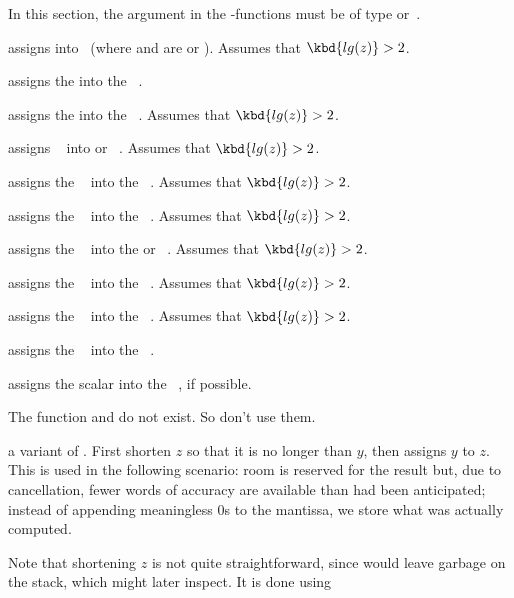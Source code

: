 In this section, the  argument in the -functions must be of type
 or~.

 assigns  into~ (where 
and  are  or ).
Assumes that $\kbd{lg(z)} > 2$.

 assigns the   into the
~.

 assigns the   into the
~. Assumes that $\kbd{lg(z)} > 2$.

 assigns ~ into  or
~. Assumes that $\kbd{lg(z)} > 2$.

 assigns the ~ into the
~. Assumes that $\kbd{lg(z)} > 2$.

 assigns the ~ into the
~. Assumes that $\kbd{lg(z)} > 2$.

 assigns the ~ into the
 or ~. Assumes that $\kbd{lg(z)} > 2$.

 assigns the ~ into the
~. Assumes that $\kbd{lg(z)} > 2$.

 assigns the ~ into the
~. Assumes that $\kbd{lg(z)} > 2$.

 assigns the ~ into the
~.

 assigns the scalar  into the
~, if possible.

\noindent The function  and  do not exist. So don't use
them.

 a variant of . First shorten
$z$ so that it is no longer than $y$, then assigns $y$ to $z$. This is used
in the following scenario: room is reserved for the result but, due to
cancellation, fewer words of accuracy are available than had been
anticipated; instead of appending meaningless $0$s to the mantissa, we store
what was actually computed.

Note that shortening $z$ is not quite straightforward, since 
would leave garbage on the stack, which  might later inspect.
It is done using

